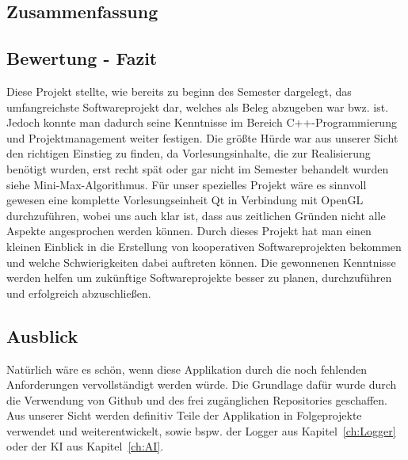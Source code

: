 \documentclass[a4paper]{scrartcl}
\begin{document}
\subsection{Zusammenfassung}\label{ch:Zusammenfassung}
 

\subsection{Bewertung - Fazit}\label{ch:Bewertung}
Diese Projekt stellte, wie bereits zu beginn des Semester dargelegt, das umfangreichste Softwareprojekt dar, welches als Beleg abzugeben war bwz. ist. Jedoch konnte man dadurch seine Kenntnisse im Bereich C++-Programmierung und  Projektmanagement weiter festigen. Die größte Hürde war aus unserer Sicht den richtigen Einstieg zu finden, da Vorlesungsinhalte, die zur Realisierung benötigt wurden, erst recht spät oder gar nicht im Semester behandelt wurden siehe Mini-Max-Algorithmus. Für unser spezielles Projekt wäre es sinnvoll gewesen eine komplette Vorlesungseinheit Qt in Verbindung mit OpenGL durchzuführen, wobei uns auch klar ist, dass aus zeitlichen Gründen nicht alle Aspekte angesprochen werden können. Durch dieses Projekt hat man einen kleinen Einblick in die Erstellung von kooperativen Softwareprojekten bekommen und welche Schwierigkeiten dabei auftreten können. Die gewonnenen Kenntnisse werden helfen um zukünftige Softwareprojekte besser zu planen, durchzuführen und erfolgreich abzuschließen. 

\subsection{Ausblick}\label{ch:Ausblick}
Natürlich wäre es schön, wenn diese Applikation durch die noch fehlenden Anforderungen vervollständigt werden würde. Die Grundlage dafür wurde durch die Verwendung von Github und des frei zugänglichen Repositories geschaffen. Aus unserer Sicht werden definitiv Teile der Applikation in Folgeprojekte verwendet und weiterentwickelt, sowie bspw. der Logger aus Kapitel~\ref{ch:Logger} oder der KI aus Kapitel~\ref{ch:AI}.

\newpage

% 
%
%
\printbibliography 

\end{document}
